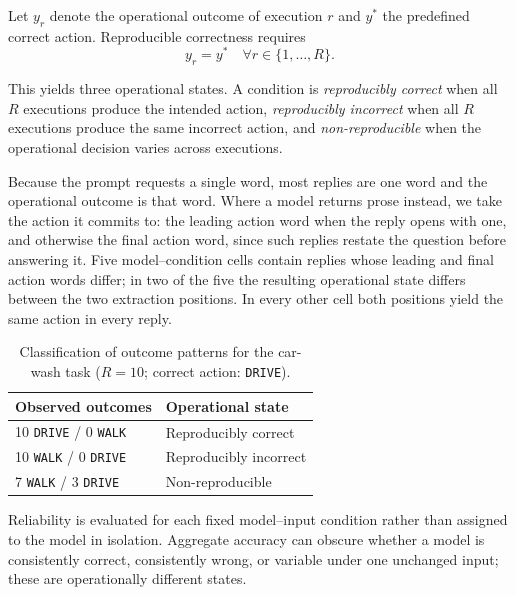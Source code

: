 Let $y_r$ denote the operational outcome of execution $r$ and $y^*$
the predefined correct action. Reproducible correctness requires
\begin{equation}
    y_r = y^* \quad \forall r \in \{1,\ldots,R\}.
    \label{eq:reproducible-correctness}
\end{equation}

This yields three operational states. A condition is
\emph{reproducibly correct} when all $R$ executions produce the
intended action, \emph{reproducibly incorrect} when all $R$ executions
produce the same incorrect action, and \emph{non-reproducible} when
the operational decision varies across executions.

Because the prompt requests a single word, most replies are one word
and the operational outcome is that word. Where a model returns prose
instead, we take the action it commits to: the leading action word
when the reply opens with one, and otherwise the final action word,
since such replies restate the question before answering it. Five
model--condition cells contain replies whose leading and final action
words differ; in two of the five the resulting operational state
differs between the two extraction positions. In every other cell both
positions yield the same action in every reply.

\begin{table}[h]
\centering
\caption{Classification of outcome patterns for the car-wash task
($R=10$; correct action: \texttt{DRIVE}).}
\label{tab:operational-states}
\vspace{6pt}
\small
\begin{tabular*}{0.75\columnwidth}{@{\extracolsep{\fill}}ll@{}}
\toprule
\textbf{Observed outcomes} & \textbf{Operational state} \\
\midrule
10 \texttt{DRIVE} / 0 \texttt{WALK} & Reproducibly correct \\
10 \texttt{WALK} / 0 \texttt{DRIVE} & Reproducibly incorrect \\
7 \texttt{WALK} / 3 \texttt{DRIVE} & Non-reproducible \\
\bottomrule
\end{tabular*}
\end{table}

Reliability is evaluated for each fixed model--input condition rather
than assigned to the model in isolation. Aggregate accuracy can obscure
whether a model is consistently correct, consistently wrong, or
variable under one unchanged input; these are operationally different
states.

